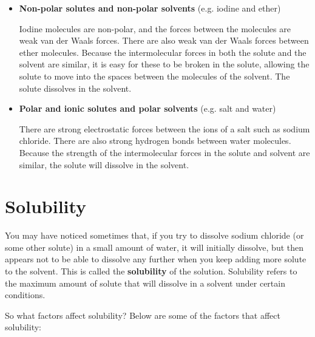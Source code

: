 \begin{itemize}
\item{\textbf{Non-polar solutes and non-polar solvents} (e.g. iodine and ether)

Iodine molecules are non-polar, and the forces between the molecules are weak van der Waals forces. There are also weak van der Waals forces between ether molecules. Because the intermolecular forces in both the solute and the solvent are similar, it is easy for these to be broken in the solute, allowing the solute to move into the spaces between the molecules of the solvent. The solute dissolves in the solvent.\\}

\item{\textbf{Polar and ionic solutes and polar solvents} (e.g. salt and water})

There are strong electrostatic forces between the ions of a salt such as sodium chloride. There are also strong hydrogen bonds between water molecules. Because the strength of the intermolecular forces in the solute and solvent are similar, the solute will dissolve in the solvent.
\end{itemize}

\section{Solubility}
\label{sec:soln:solubility}

You may have noticed sometimes that, if you try to dissolve sodium chloride (or some other solute) in a small amount of water, it will initially dissolve, but then appears not to be able to dissolve any further when you keep adding more solute to the solvent. This is called the \textbf{solubility} of the solution. Solubility refers to the maximum amount of solute that will dissolve in a solvent under certain conditions.


So what factors affect solubility? Below are some of the factors that affect solubility:

